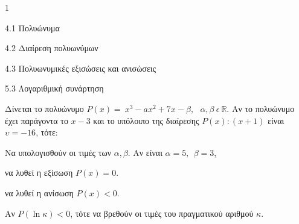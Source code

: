 \begin{ylh}{1}
\item 4.1 Πολυώνυμα
\item 4.2 Διαίρεση πολυωνύμων
\item 4.3 Πολυωνυμικές εξισώσεις και ανισώσεις
\item 5.3 Λογαριθμική συνάρτηση
\end{ylh}
Δίνεται το πολυώνυμο $P(x) = \ x^{3} - ax^{2} + 7x - \beta,\ \ \ \alpha,\beta\ \epsilon\ \mathbb{R}.$
Αν το πολυώνυμο έχει παράγοντα το $x - 3$ και το υπόλοιπο της διαίρεσης $P(x):(x + 1)$ είναι $\upsilon = - 16$, τότε:
\begin{alist}
\item Να υπολογισθούν οι τιμές των $\alpha,\beta$.
Αν είναι $\alpha = 5,\ \ \beta = 3$,
\item να λυθεί η εξίσωση $P(x) = 0$.
\item να λυθεί η ανίσωση $P(x) < 0$.
\item Αν $P\left( \ln\kappa \right) < 0$, τότε να βρεθούν οι τιμές του πραγματικού αριθμού $\kappa$.
\end{alist}

